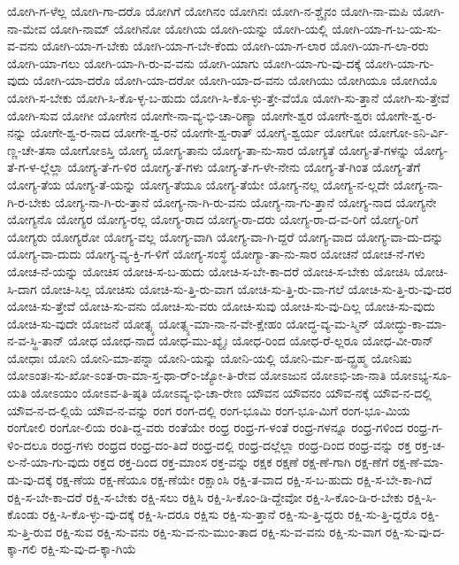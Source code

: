{ಯೋಗಿ-ಗ-ಳೆಲ್ಲ
ಯೋಗಿ-ಗಾ-ದರೊ
ಯೋಗಿಗೆ
ಯೋಗಿನಂ
ಯೋಗಿನಃ
ಯೋಗಿ-ನ-ಶ್ಚೈನಂ
ಯೋಗಿ-ನಾ-ಮಪಿ
ಯೋಗಿ-ನಾ-ಮೇವ
ಯೋಗಿ-ನಾಮ್
ಯೋಗಿನೋ
ಯೋಗಿಯ
ಯೋಗಿ-ಯನ್ನು
ಯೋಗಿ-ಯಲ್ಲಿ
ಯೋಗಿ-ಯಾ-ಗ-ಬ-ಯ-ಸು-ವ-ವನು
ಯೋಗಿ-ಯಾ-ಗ-ಬೇಕು
ಯೋಗಿ-ಯಾ-ಗ-ಬೇ-ಕೆಂದು
ಯೋಗಿ-ಯಾ-ಗ-ಲಾರ
ಯೋಗಿ-ಯಾ-ಗ-ಲಾ-ರರು
ಯೋಗಿ-ಯಾ-ಗಲು
ಯೋಗಿ-ಯಾ-ಗಿ-ರು-ವ-ವನು
ಯೋಗಿ-ಯಾಗು
ಯೋಗಿ-ಯಾ-ಗು-ವು-ದಕ್ಕೆ
ಯೋಗಿ-ಯಾ-ಗು-ವುದು
ಯೋಗಿ-ಯಾ-ದರೊ
ಯೋಗಿ-ಯಾ-ದರೋ
ಯೋಗಿ-ಯಾ-ದ-ವನು
ಯೋಗಿಯು
ಯೋಗಿಯೂ
ಯೋಗಿಯೊ
ಯೋಗಿ-ಸ-ಬೇಕು
ಯೋಗಿ-ಸಿ-ಕೊ-ಳ್ಳ-ಬ-ಹುದು
ಯೋಗಿ-ಸಿ-ಕೊ-ಳ್ಳು-ತ್ತೇ-ವೆಯೊ
ಯೋಗಿ-ಸು-ತ್ತಾನೆ
ಯೋಗಿ-ಸು-ತ್ತೇವೆ
ಯೋಗಿ-ಸುವ
ಯೋಗೀ
ಯೋಗೇನ
ಯೋಗೇ-ನಾ-ವ್ಯ-ಭಿ-ಚಾ-ರಿಣ್ಯಾ
ಯೋಗೇ-ಶ್ವರ
ಯೋಗೇ-ಶ್ವರಃ
ಯೋಗೇ-ಶ್ವ-ರ-ನನ್ನು
ಯೋಗೇ-ಶ್ವ-ರ-ನಾದ
ಯೋಗೇ-ಶ್ವ-ರನೆ
ಯೋಗೇ-ಶ್ವ-ರಾತ್
ಯೋಗೈ-ಶ್ವರ್ಯ
ಯೋಗೋ
ಯೋಗೋ-ಽನಿ-ರ್ವಿ-ಣ್ಣ-ಚೇ-ತಸಾ
ಯೋಗೋಽಸ್ತಿ
ಯೋಗ್ಯ
ಯೋಗ್ಯ-ತಾನು
ಯೋಗ್ಯ-ತಾ-ನು-ಸಾರ
ಯೋಗ್ಯತೆ
ಯೋಗ್ಯ-ತೆ-ಗಳನ್ನು
ಯೋಗ್ಯ-ತೆ-ಗ-ಳ-ಲ್ಲೆಲ್ಲಾ
ಯೋಗ್ಯ-ತೆ-ಗ-ಳಿರ
ಯೋಗ್ಯ-ತೆ-ಗಳು
ಯೋಗ್ಯ-ತೆ-ಗ-ಳೇ-ನೇನು
ಯೋಗ್ಯ-ತೆ-ಗಿಂತ
ಯೋಗ್ಯ-ತೆಗೆ
ಯೋಗ್ಯ-ತೆಯ
ಯೋಗ್ಯ-ತೆ-ಯನ್ನು
ಯೋಗ್ಯ-ತೆಯೂ
ಯೋಗ್ಯ-ತೆಯೇ
ಯೋಗ್ಯ-ನಲ್ಲ
ಯೋಗ್ಯ-ನ-ಲ್ಲದೇ
ಯೋಗ್ಯ-ನಾ-ಗಿ-ರ-ಬೇಕು
ಯೋಗ್ಯ-ನಾ-ಗಿ-ರು-ತ್ತಾನೆ
ಯೋಗ್ಯ-ನಾ-ಗಿ-ರು-ವನು
ಯೋಗ್ಯ-ನಾ-ಗು-ತ್ತಾನೆ
ಯೋಗ್ಯ-ನಾದ
ಯೋಗ್ಯನೇ
ಯೋಗ್ಯನೊ
ಯೋಗ್ಯರ
ಯೋಗ್ಯ-ರಲ್ಲ
ಯೋಗ್ಯ-ರಾದ
ಯೋಗ್ಯ-ರಾ-ದರು
ಯೋಗ್ಯ-ರಾ-ದ-ವ-ರಿಗೆ
ಯೋಗ್ಯ-ರಿಗೆ
ಯೋಗ್ಯರು
ಯೋಗ್ಯರೋ
ಯೋಗ್ಯ-ವಲ್ಲ
ಯೋಗ್ಯ-ವಾಗಿ
ಯೋಗ್ಯ-ವಾ-ಗಿ-ದ್ದರೆ
ಯೋಗ್ಯ-ವಾದ
ಯೋಗ್ಯ-ವಾ-ದು-ದನ್ನು
ಯೋಗ್ಯ-ವಾ-ದುದು
ಯೋಗ್ಯ-ವ್ಯ-ಕ್ತಿ-ಗ-ಳಿಗೆ
ಯೋಗ್ಯ-ಸಂಸ್ಥೆ
ಯೋಗ್ಯಾ-ತಾ-ನು-ಸಾರ
ಯೋಚನೆ
ಯೋಚ-ನೆ-ಗಳು
ಯೋಚ-ನೆ-ಯನ್ನು
ಯೋಚಿಸ
ಯೋಚಿ-ಸ-ಬ-ಹುದು
ಯೋಚಿ-ಸ-ಬೇ-ಕಾ-ದರೆ
ಯೋಚಿ-ಸ-ಬೇಕು
ಯೋಚಿಸಿ
ಯೋಚಿ-ಸಿ-ದಾಗ
ಯೋಚಿ-ಸಿಲ್ಲ
ಯೋಚಿಸು
ಯೋಚಿ-ಸು-ತ್ತಿ-ರು-ವಾಗ
ಯೋಚಿ-ಸು-ತ್ತಿ-ರು-ವಾ-ಗಲೆ
ಯೋಚಿ-ಸು-ತ್ತಿ-ರು-ವು-ದರ
ಯೋಚಿ-ಸು-ತ್ತೇವೆ
ಯೋಚಿ-ಸು-ವನು
ಯೋಚಿ-ಸು-ವರು
ಯೋಚಿ-ಸುವು
ಯೋಚಿ-ಸು-ವು-ದಿಲ್ಲ
ಯೋಚಿ-ಸು-ವುದು
ಯೋಚಿ-ಸು-ವುದೇ
ಯೋಜನೆ
ಯೋತ್ಸ್ಯ
ಯೋತ್ಸ್ಯ-ಮಾ-ನಾ-ನ-ವೇ-ಕ್ಷೇಹಂ
ಯೋದ್ಧ-ವ್ಯ-ಮ-ಸ್ಮಿನ್
ಯೋದ್ಧು-ಕಾ-ಮಾ-ನ-ವ-ಸ್ಥಿ-ತಾನ್
ಯೋಧ
ಯೋಧ-ನಾದ
ಯೋಧ-ಮು-ಖ್ಯೈಃ
ಯೋಧ-ರಿಂದ
ಯೋಧ-ರೆ-ಲ್ಲರೂ
ಯೋಧ-ವೀ-ರಾನ್
ಯೋಧಾಃ
ಯೋನಿ
ಯೋನಿ-ಮಾ-ಪನ್ನಾ
ಯೋನಿ-ಯನ್ನು
ಯೋನಿ-ಯಲ್ಲಿ
ಯೋನಿ-ರ್ಮ-ಹ-ದ್ಬ್ರಹ್ಮ
ಯೋನಿಷು
ಯೋಽಂತಃ-ಸು-ಖೋ-ಽಂತ-ರಾ-ಮಾ-ಸ್ತ-ಥಾ-ರ್ಂ-ಜ್ಯೋ-ತಿ-ರೇವ
ಯೋಽಜುನ
ಯೋಽಭಿ-ಜಾ-ನಾತಿ
ಯೋಽಭ್ಯ-ಸೂ-ಯತಿ
ಯೋಽಯಂ
ಯೋಽವ-ತಿ-ಷ್ಠತಿ
ಯೋಽವ್ಯ-ಭಿ-ಚಾ-ರೇಣ
ಯೌವನ
ಯೌವನಂ
ಯೌವ-ನಕ್ಕೆ
ಯೌವ-ನ-ದಲ್ಲಿ
ಯೌವ-ನ-ದ-ಲ್ಲಿಯೆ
ಯೌವ-ನ-ವನ್ನು
ರಂಗ
ರಂಗ-ದಲ್ಲಿ
ರಂಗ-ಭೂಮಿ
ರಂಗ-ಭೂ-ಮಿಗೆ
ರಂಗ-ಭೂ-ಮಿಯ
ರಂಗೋಲಿ
ರಂಗೋ-ಲಿಯ
ರಂತಿ-ದ್ದ-ವರು
ರಂತೆಯೇ
ರಂಧ್ರ
ರಂಧ್ರ-ಗ-ಳಂತೆ
ರಂಧ್ರ-ಗಳನ್ನೂ
ರಂಧ್ರ-ಗಳಿಂದ
ರಂಧ್ರ-ಗ-ಳಿಂ-ದಲೂ
ರಂಧ್ರ-ಗಳು
ರಂಧ್ರದ
ರಂಧ್ರ-ದಂ-ತಿದೆ
ರಂಧ್ರ-ದಲ್ಲಿ
ರಂಧ್ರ-ದಲ್ಲೆಲ್ಲಾ
ರಂಧ್ರ-ದಿಂದ
ರಂಧ್ರ-ವನ್ನು
ರಕ್ತ
ರಕ್ತ-ಚ-ಲ-ನೆ-ಯಾ-ಗು-ವುದು
ರಕ್ತದ
ರಕ್ತ-ದಿಂದ
ರಕ್ತ-ಮಾಂಸ
ರಕ್ತ-ವನ್ನು
ರಕ್ಷಕ
ರಕ್ಷಣೆ
ರಕ್ಷ-ಣೆ-ಗಾಗಿ
ರಕ್ಷ-ಣೆಗೆ
ರಕ್ಷ-ಣೆ-ಮಾ-ಡು-ವು-ದಕ್ಕೆ
ರಕ್ಷ-ಣೆಯ
ರಕ್ಷ-ಣೆಯೂ
ರಕ್ಷ-ಣೆಯೇ
ರಕ್ಷಾಂಸಿ
ರಕ್ಷಿ-ತ-ವಾದ
ರಕ್ಷಿ-ಸ-ಬ-ಹುದು
ರಕ್ಷಿ-ಸ-ಬೇ-ಕಾ-ಗಿದೆ
ರಕ್ಷಿ-ಸ-ಬೇ-ಕಾ-ದರೆ
ರಕ್ಷಿ-ಸ-ಬೇಕು
ರಕ್ಷಿ-ಸಲು
ರಕ್ಷಿಸಿ
ರಕ್ಷಿ-ಸಿ-ಕೊಂ-ಡಿ-ದ್ದೇವೋ
ರಕ್ಷಿ-ಸಿ-ಕೊಂ-ಡಿ-ರ-ಬೇಕು
ರಕ್ಷಿ-ಸಿ-ಕೊಂಡು
ರಕ್ಷಿ-ಸಿ-ಕೊ-ಳ್ಳು-ವು-ದಕ್ಕೆ
ರಕ್ಷಿ-ಸಿ-ದರೂ
ರಕ್ಷಿಸು
ರಕ್ಷಿ-ಸು-ತ್ತಾನೆ
ರಕ್ಷಿ-ಸು-ತ್ತಿ-ದ್ದರು
ರಕ್ಷಿ-ಸು-ತ್ತಿ-ದ್ದರೊ
ರಕ್ಷಿ-ಸು-ತ್ತಿ-ರುವ
ರಕ್ಷಿ-ಸುವ
ರಕ್ಷಿ-ಸು-ವನು
ರಕ್ಷಿ-ಸು-ವ-ನು-ಮುಂ-ತಾದ
ರಕ್ಷಿ-ಸು-ವ-ವನು
ರಕ್ಷಿ-ಸು-ವಾಗ
ರಕ್ಷಿ-ಸು-ವು-ದ-ಕ್ಕಾ-ಗಲಿ
ರಕ್ಷಿ-ಸು-ವು-ದ-ಕ್ಕಾ-ಗಿಯೆ
}
